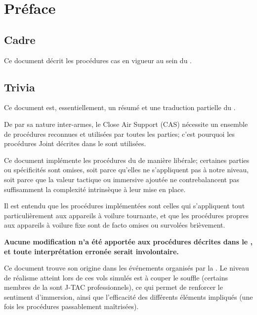 \newpage

\thispagestyle{default}



\section*{Préface}

\subsection*{Cadre}

Ce document décrit les procédures \acrfull{cas} en vigueur au sein du \rgt{}.

\subsection*{Trivia}

Ce document est, essentiellement, un résumé et une traduction partielle du \jp{}.

De par sa nature inter-armes, le Close Air Support (CAS) nécessite un ensemble de procédures reconnues et utilisées par toutes les parties; c'est pourquoi les procédures Joint décrites dans le \jp{} sont utilisées.

Ce document implémente les procédures du \jp{} de manière libérale; certaines parties ou spécificités sont omises, soit parce qu'elles ne s'appliquent pas à notre niveau, soit parce que la valeur tactique ou immersive ajoutée ne contrebalancent pas suffisamment la complexité intrinsèque à leur mise en place.

Il est entendu que les procédures implémentées sont celles qui s'appliquent tout particulièrement aux appareils à voilure tournante, et que les procédures propres aux appareils à voilure fixe sont de facto omises ou survolées brièvement.

\textbf{Aucune modification n'a été apportée aux procédures décrites dans le \jp{}, et toute interprétation erronée serait involontaire.}

Ce document trouve son origine dans les événements organisés par la \onethreetwo{}. Le niveau de réalisme atteint lors de ces vols simulés est à couper le souffle (certains membres de la \onethreetwo{} sont J-TAC professionnels), ce qui permet de renforcer le sentiment d'immersion, ainsi que l'efficacité des différents éléments impliqués (une fois les procédures passablement maîtrisées). 